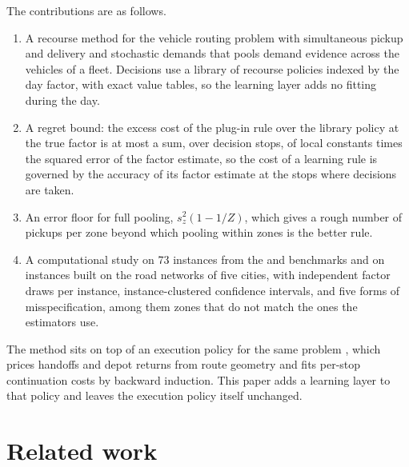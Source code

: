 \documentclass[preprint,authoryear,12pt]{elsarticle}
\begin{document}
The contributions are as follows.
\begin{enumerate}
\item A recourse method for the vehicle routing problem with
  simultaneous pickup and delivery and stochastic demands that pools
  demand evidence across the vehicles of a fleet. Decisions use a
  library of recourse policies indexed by the day factor, with exact
  value tables, so the learning layer adds no fitting during the day.
\item A regret bound: the excess cost of the plug-in rule over the
  library policy at the true factor is at most a sum, over decision
  stops, of local constants times the squared error of the factor
  estimate, so the cost of a learning rule is governed by the accuracy
  of its factor estimate at the stops where decisions are taken.
\item An error floor for full pooling, $s_z^2(1-1/Z)$, which gives a
  rough number of pickups per zone beyond which pooling within zones is
  the better rule.
\item A computational study on 73 instances from the
  \citet{dethloff2001vehicle} and \citet{salhi1999cluster} benchmarks and
  on instances built on the road networks of five cities, with
  independent factor draws per instance, instance-clustered confidence
  intervals, and five forms of misspecification, among them zones that
  do not match the ones the estimators use.
\end{enumerate}

The method sits on top of an execution policy for the same problem
\citep{dang2026baton}, which prices handoffs and depot returns from route
geometry and fits per-stop continuation costs by backward induction.
This paper adds a learning layer to that policy and leaves the execution
policy itself unchanged.

\section{Related work}\label{sec:related}
\end{document}
